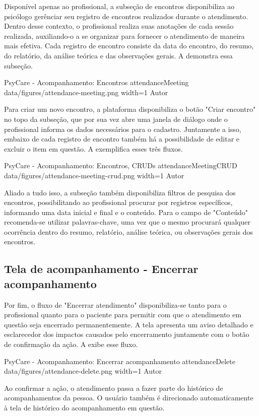 Disponível apenas ao profissional, a subseção de encontros disponibiliza ao psicólogo gerênciar seu registro de encontros realizados durante o atendimento. Dentro desse contexto, o profissional realiza suas anotações de cada sessão realizada, auxiliando-o a se organizar para fornecer o atendimento de maneira mais efetiva. Cada registro de encontro consiste da data do encontro, do resumo, do relatório, da análise teórica e das observações gerais. A  demonstra essa subseção.

\image
    {PsyCare - Acompanhamento: Encontros}
    {attendanceMeeting}
    {data/figures/attendance-meeting.png}
    {width=1\textwidth}
    {Autor}

Para criar um novo encontro, a plataforma disponibiliza o botão "Criar encontro" no topo da subseção, que por sua vez abre uma janela de diálogo onde o profissional informa os dados necessários para o cadastro. Juntamente a isso, embaixo de cada registro de encontro também há a possibilidade de editar e excluir o item em questão. A  exemplifica esses três fluxos.

\image
    {PsyCare - Acompanhamento: Encontros, CRUDs}
    {attendanceMeetingCRUD}
    {data/figures/attendance-meeting-crud.png}
    {width=1\textwidth}
    {Autor}

Aliado a tudo isso, a subseção também disponibiliza filtros de pesquisa dos encontros, possibilitando ao profissional procurar por registros específicos, informando uma data inicial e final e o conteúdo. Para o campo de "Conteúdo" recomenda-se utilizar palavras-chave, uma vez que o mesmo procurará qualquer ocorrência dentro do resumo, relatório, análise teórica, ou observações gerais dos encontros.

\subsection{Tela de acompanhamento - Encerrar acompanhamento}
\label{sec:acompanhamentoEncerrar}

Por fim, o fluxo de "Encerrar atendimento" disponibiliza-se tanto para o profissional quanto para o paciente para permitir com que o atendimento em questão seja encerrado permanentemente. A tela apresenta um aviso detalhado e esclarecedor dos impactos causados pelo encerramento juntamente com o botão de confirmação da ação. A  exibe esse fluxo.

\image
    {PsyCare - Acompanhamento: Encerrar acompanhamento}
    {attendanceDelete}
    {data/figures/attendance-delete.png}
    {width=1\textwidth}
    {Autor}

Ao confirmar a ação, o atendimento passa a fazer parte do histórico de acompanhamentos da pessoa. O usuário também é direcionado automaticamente à tela de histórico do acompanhamento em questão.